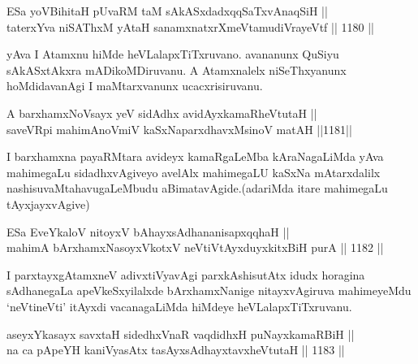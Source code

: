 

\begin{shl}
ESa yoV\s BihitaH pUvaRM taM sAkASxdadxqqSaTxvAnaqSiH || \\
taterxYva niSAThxM yAtaH sanamxnatxrXmeVtamudiVrayeVtf \hfill || 1180 ||  
\end{shl}

\begin{artha}
yAva I Atamxnu hiMde heVLalapxTiTxruvano. avananunx QuSiyu sAkASxtAkxra mADikoMDiruvanu. A Atamxnalelx niSeThxyanunx hoMdidavanAgi I maMtarxvanunx ucacxrisiruvanu.
\end{artha}


\begin{shl}
A barxhamxNoV\s sayx yeV sidAdhx avidAyxkamaRheVtutaH || \\
saveVR\s pi mahimAnoV\s miV kaSxNaparxdhavxMsinoV matAH \hfill ||1181||  
\end{shl}

\begin{artha}
I barxhamxna payaRMtara avideyx kamaRgaLeMba kAraNagaLiMda yAva mahimegaLu sidadhxvAgiveyo avelAlx mahimegaLU kaSxNa mAtarxdalilx nashisuvaMtahavugaLeMbudu aBimatavAgide.(adariMda itare mahimegaLu tAyxjayxvAgive)
\end{artha}

\begin{shl}
ESa EveYkaloV nitoyxV bAhayxsAdhananisapxqqhaH || \\
mahimA bArxhamxNasoyxVkotxV neVtiVtAyxduyxkitxBiH purA \hfill || 1182 ||  
\end{shl}

\begin{artha}
I parxtayxgAtamxneV adivxtiVyavAgi parxkAshisutAtx idudx horagina sAdhanegaLa apeVkeSxyilalxde bArxhamxNanige nitayxvAgiruva mahimeyeMdu `neVtineVti' itAyxdi vacanagaLiMda hiMdeye heVLalapxTiTxruvanu.
\end{artha}

\begin{shl}
aseyxYkasayx savxtaH sidedhxVnaR vaqdidhxH puNayxkamaRBiH || \\
na ca pApeYH kaniVyasAtx tasAyxsAdhayxtavxheVtutaH \hfill || 1183 ||  
\end{shl}

